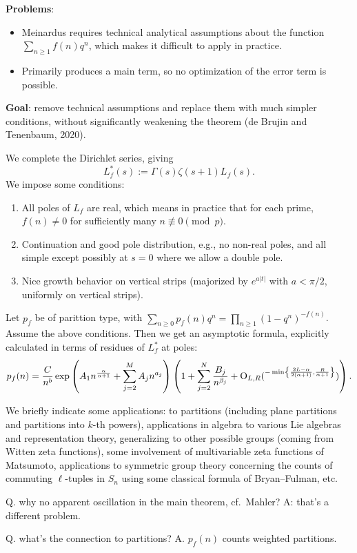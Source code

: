 \documentclass[reqno]{amsart} 
\numberwithin{theorem}{section}
\numberwithin{equation}{section}
\begin{document}
\textbf{Problems}:
\begin{itemize}
\item Meinardus requires technical analytical assumptions about the function $\sum_{n \geq 1} f(n) q^n$, which makes it difficult to apply in practice.
\item Primarily produces a main term, so no optimization of the error term is possible.
\end{itemize}
\textbf{Goal}: remove technical assumptions and replace them with much simpler conditions, without significantly weakening the theorem (de Brujin and Tenenbaum, 2020).

We complete the Dirichlet series, giving
\begin{equation*}
  L_f^\ast(s) := \Gamma(s) \zeta(s + 1) L_f(s).
\end{equation*}
We impose some conditions:
\begin{enumerate}
\item All poles of $L_f$ are real, which means in practice that for each prime, $f(n) \neq 0$ for sufficiently many $n \not \equiv 0 \pmod{p}$.
\item Continuation and good pole distribution, e.g., no non-real poles, and all simple except possibly at $s = 0$ where we allow a double pole.
\item Nice growth behavior on vertical strips (majorized by $e^{a \lvert t \rvert}$ with $a < \pi/2$, uniformly on vertical strips).
\end{enumerate}
\begin{theorem}
  Let $p_f $ be of parittion type, with $\sum_{n \geq 0} p_f(n) q^n = \prod_{n \geq 1}(1 - q^n)^{- f(n)}$.  Assume the above conditions.  Then we get an asymptotic formula, explicitly calculated in terms of residues of $L_f^\ast$ at poles:
  \begin{equation*}
    p_f(n) = \frac{C}{ n^b} \exp \left( A_1 n^{\frac{\alpha}{ \alpha + 1}} + \sum_{j = 2}^M A_j n^{a_j} \right)
    \left( 1 + \sum_{j = 2}^N \frac{B_j}{ n^{\beta_j}} + \operatorname{O}_{L, R}(^{- \min \left\{ \frac{2 L - \alpha}{2(\alpha + 1)}, \frac{R}{\alpha + 1} \right\}}) \right).
  \end{equation*}
\end{theorem}

We briefly indicate some applications: to partitions (including plane partitions and partitions into $k$-th powers), applications in algebra to various Lie algebras and representation theory, generalizing to other possible groups (coming from Witten zeta functions), some involvement of multivariable zeta functions of Matsumoto, applications to symmetric group theory concerning the counts of commuting $\ell$-tuples in $S_n$ using some classical formula of Bryan--Fulman, etc.


Q. why no apparent oscillation in the main theorem, cf.\ Mahler?  A: that's a different problem.

Q. what's the connection to partitions?  A. $p_f(n)$ counts weighted partitions.

{} 
\end{document}
